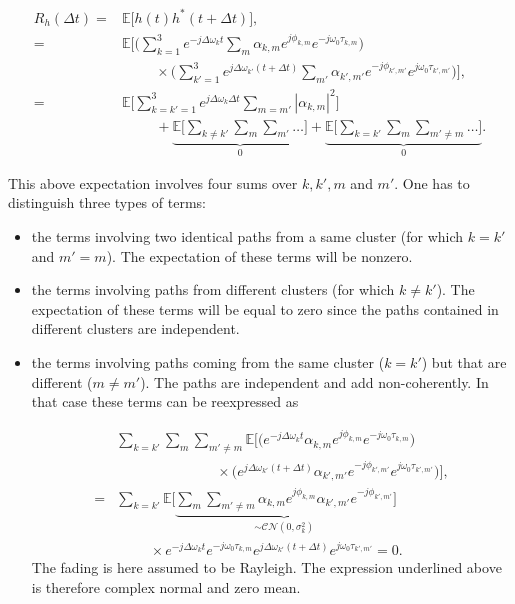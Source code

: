 \documentclass [a4paper, 11pt] {article}
\begin{document}
\begin{solution}
\begin{enumerate}
        \begin{align}
             R_h(\Delta t) =& \mathbb{E}\Big[h(t)h^*(t+\Delta t)\Big],\\
             =& \mathbb{E}\Bigg[\Big( \sum_{k=1}^{3} e^{-j\Delta \omega_{k} t} \sum_m \alpha_{k,m} e^{j\phi_{k,m}} e^{-j\omega_0 \tau_{k,m}} \Big) \\
             &\hspace{1cm}\times \Big( \sum_{k'=1}^{3} e^{j\Delta \omega_{k'} (t+\Delta t)} \sum_{m'} \alpha_{k',m'} e^{-j\phi_{k',m'}} e^{j\omega_0 \tau_{k',m'}} \Big) \Bigg] \nonumber,\\
             =& \mathbb{E}\Bigg[ \sum_{k = k'=1}^{3} e^{j\Delta \omega_{k} \Delta t} \sum_{m = m'} | \alpha_{k,m}|^2 \Bigg]\\
             &\hspace{1cm}+ \underbrace{\mathbb{E}\Bigg[\sum_{k\neq k'} \sum_{m} \sum_{m'} \hdots \Bigg] }_{0}
              + \underbrace{\mathbb{E}\Bigg[ \sum_{k = k'} \sum_{m} \sum_{m'\neq m} \hdots\Bigg] }_{0}.\nonumber
        \end{align}

        This above expectation involves four sums over $k,k',m$ and $m'$. One has to distinguish three types of terms:

        \begin{itemize}
            \item the terms involving two identical paths from a same cluster (for which $k=k'$ and $m'=m$). The expectation of these terms will be nonzero.
            \item the terms involving paths from different clusters (for which $k\neq k'$). The expectation of these terms will be equal to zero since the paths contained in different clusters are independent.
            \item the terms involving paths coming from the same cluster ($k=k'$) but that are different ($m\neq m'$). The paths are independent and add non-coherently. In that case these terms can be reexpressed as

            \begin{align}
             &\sum_{k = k'} \sum_{m} \sum_{m'\neq m} \mathbb{E}\Bigg[\Big(  e^{-j\Delta \omega_{k} t} \alpha_{k,m} e^{j\phi_{k,m}} e^{-j\omega_0 \tau_{k,m}} \Big)\\
             &\hspace{3cm} \times\Big(  e^{j\Delta \omega_{k'} (t+\Delta t)} \alpha_{k',m'} e^{-j\phi_{k',m'}} e^{j\omega_0 \tau_{k',m'}} \Big) \Bigg] \nonumber,\\
             =&\sum_{k = k'} \mathbb{E}\Bigg[ \underbrace{\sum_{m} \sum_{m'\neq m} \alpha_{k,m} e^{j\phi_{k,m}}  \alpha_{k',m'} e^{-j\phi_{k',m'}}}_{\sim \mathcal{CN}(0,\sigma_k^2)}  \Bigg] \\
             &\hspace{1cm}\times e^{-j\Delta \omega_{k} t}  e^{-j\omega_0 \tau_{k,m}} e^{j\Delta \omega_{k'} (t+\Delta t)} e^{j\omega_0 \tau_{k',m'}} = 0\nonumber.
            \end{align}
        The fading is here assumed to be Rayleigh. The expression underlined above is therefore complex normal and zero mean.


\end{itemize}
\end{enumerate}
\end{solution}
\end{document}
